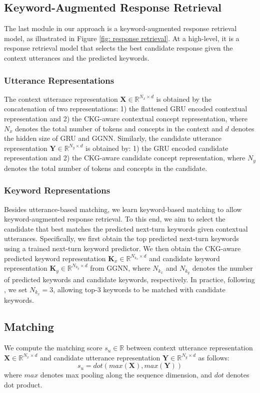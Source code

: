 \documentclass[letterpaper]{article} %
\begin{document}
\subsection{Keyword-Augmented Response Retrieval}
The last module in our approach is a keyword-augmented response retrieval model, as illustrated in Figure \ref{fig: response retrieval}. At a high-level, it is a response retrieval model that selects the best candidate response given the context utterances and the predicted keywords.

\subsubsection{Utterance Representations}
The context utterance representation $\mathbf{X} \in \mathbb{R}^{N_x \times d}$ is obtained by the concatenation of two representations: 1) the flattened GRU encoded contextual representation and 2) the CKG-aware contextual concept representation, where $N_x$ denotes the total number of tokens and concepts in the context and $d$ denotes the hidden size of GRU and GGNN. Similarly, the candidate utterance representation $\mathbf{Y} \in \mathbb{R}^{N_y \times d}$ is obtained by: 1) the GRU encoded candidate representation and 2) the CKG-aware candidate concept representation, where $N_y$ denotes the total number of tokens and concepts in the candidate.

\subsubsection{Keyword Representations}
Besides utterance-based matching, we learn keyword-based matching to allow keyword-augmented response retrieval. To this end, we aim to select the candidate that best matches the predicted next-turn keywords given contextual utterances. Specifically, we first obtain the top predicted next-turn keywords using a trained next-turn keyword predictor. We then obtain the CKG-aware predicted keyword representation $\mathbf{K}_x \in \mathbb{R}^{N_{k_x} \times d}$ and candidate keyword representation $\mathbf{K}_y \in \mathbb{R}^{N_{k_y} \times d}$ from GGNN, where $N_{k_x}$ and $N_{k_y}$ denotes the number of predicted keywords and candidate keywords, respectively. In practice, following \cite{tang2019target}, we set $N_{k_x} = 3$, allowing top-3 keywords to be matched with candidate keywords.

\subsection{Matching}
We compute the matching score $s_u \in \mathbb{R}$ between context utterance representation $\mathbf{X} \in \mathbb{R}^{N_x \times d}$ and candidate utterance representation $\mathbf{Y} \in \mathbb{R}^{N_y \times d}$ as follows:
\begin{equation}
\label{eqn: utterance matching}
    s_u = \textit{dot}(\textit{max}(\mathbf{X}), \textit{max}(\mathbf{Y}))
\end{equation}
where $\textit{max}$ denotes max pooling along the sequence dimension, and $\textit{dot}$ denotes dot product.
\end{document}
